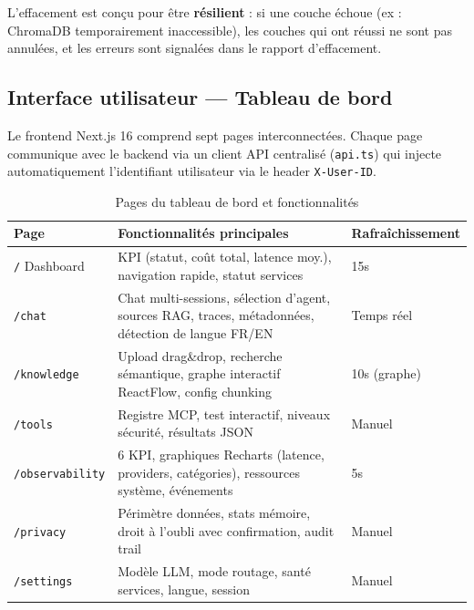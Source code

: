 \documentclass[12pt, a4paper]{article}
\begin{document}
L'effacement est conçu pour être \textbf{résilient} : si une couche échoue (ex : ChromaDB temporairement inaccessible), les couches qui ont réussi ne sont pas annulées, et les erreurs sont signalées dans le rapport d'effacement.

\subsection{Interface utilisateur — Tableau de bord}

Le frontend Next.js 16 comprend sept pages interconnectées. Chaque page communique avec le backend via un client API centralisé (\texttt{api.ts}) qui injecte automatiquement l'identifiant utilisateur via le header \texttt{X-User-ID}.

\begin{table}[H]
\centering
\caption{Pages du tableau de bord et fonctionnalités}
\label{tab:ui_pages}
\small
\begin{tabularx}{\textwidth}{l X l}
\toprule
\textbf{Page} & \textbf{Fonctionnalités principales} & \textbf{Rafraîchissement} \\
\midrule
\texttt{/} Dashboard & KPI (statut, coût total, latence moy.), navigation rapide, statut services & 15s \\
\addlinespace
\texttt{/chat} & Chat multi-sessions, sélection d'agent, sources RAG, traces, métadonnées, détection de langue FR/EN & Temps réel \\
\addlinespace
\texttt{/knowledge} & Upload drag\&drop, recherche sémantique, graphe interactif ReactFlow, config chunking & 10s (graphe) \\
\addlinespace
\texttt{/tools} & Registre MCP, test interactif, niveaux sécurité, résultats JSON & Manuel \\
\addlinespace
\texttt{/observability} & 6 KPI, graphiques Recharts (latence, providers, catégories), ressources système, événements & 5s \\
\addlinespace
\texttt{/privacy} & Périmètre données, stats mémoire, droit à l'oubli avec confirmation, audit trail & Manuel \\
\addlinespace
\texttt{/settings} & Modèle LLM, mode routage, santé services, langue, session & Manuel \\
\bottomrule
\end{tabularx}
\end{table}


\end{document}
